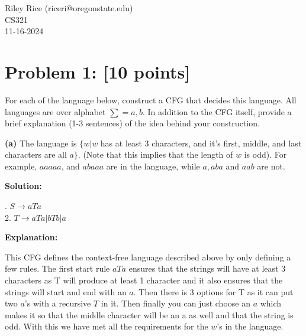 \documentclass[11pt, letterpaper]{article}
\begin{document}
\noindent Riley Rice (riceri@oregonstate.edu)\\CS321\\11-16-2024

\begin{center}\end{center}

\section*{Problem 1: [10 points]}

\noindent For each of the language below, construct a CFG that decides this language. All languages are over alphabet $\sum = {a,b}$. In addition to the CFG itself, provide a brief explanation (1-3 sentences) of the idea behind your construction. 

\vspace{5mm}

\noindent \textbf{(a)} The language is $\{w | w$ has at least 3 characters, and it's first, middle, and last characters are all $a\}$. (Note that this implies that the length of $w$ is odd). For example, $aaaaa$, and $abaaa$ are in the language, while $a, aba$ and $aab$ are not.

\vspace{5mm}

\noindent\textbf{Solution:}
 
\vspace {5mm}

. $S \rightarrow aTa$\\2. $T \rightarrow aTa | bTb | a$

\vspace {5mm}

\noindent \textbf{Explanation:}

\vspace{5mm}

\noindent This CFG defines the context-free language described above by only defining a few rules. The first start rule $aTa$ ensures that the strings will have at least 3 characters as T will produce at least 1 character and it also ensures that the strings will start and end with an $a$. Then there is 3 options for T as it can put two $a$'s with a recursive $T$ in it. Then finally you can just choose an $a$ which makes it so that the middle character will be an a as well and that the string is odd. With this we have met all the requirements for the $w$'s in the language.

\vspace{5mm}
\end{document}
